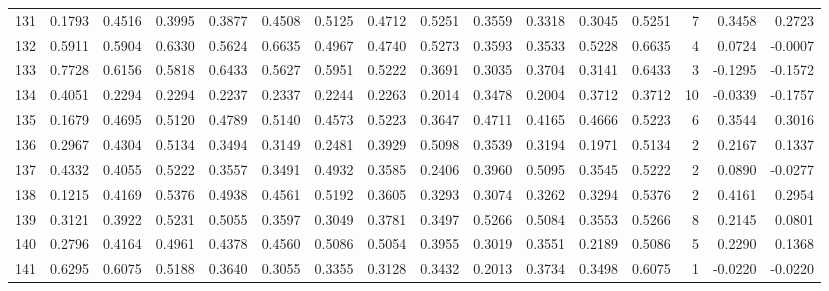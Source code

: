 \begin{tabular}{lrrrrrrrrrrrrrrr}
131 &      0.1793 &  0.4516 &  0.3995 &  0.3877 &  0.4508 &  0.5125 &  0.4712 &  0.5251 &  0.3559 &  0.3318 &   0.3045 &     0.5251 &      7 &                    0.3458 &                     0.2723 \\
132 &      0.5911 &  0.5904 &  0.6330 &  0.5624 &  0.6635 &  0.4967 &  0.4740 &  0.5273 &  0.3593 &  0.3533 &   0.5228 &     0.6635 &      4 &                    0.0724 &                    -0.0007 \\
133 &      0.7728 &  0.6156 &  0.5818 &  0.6433 &  0.5627 &  0.5951 &  0.5222 &  0.3691 &  0.3035 &  0.3704 &   0.3141 &     0.6433 &      3 &                   -0.1295 &                    -0.1572 \\
134 &      0.4051 &  0.2294 &  0.2294 &  0.2237 &  0.2337 &  0.2244 &  0.2263 &  0.2014 &  0.3478 &  0.2004 &   0.3712 &     0.3712 &     10 &                   -0.0339 &                    -0.1757 \\
135 &      0.1679 &  0.4695 &  0.5120 &  0.4789 &  0.5140 &  0.4573 &  0.5223 &  0.3647 &  0.4711 &  0.4165 &   0.4666 &     0.5223 &      6 &                    0.3544 &                     0.3016 \\
136 &      0.2967 &  0.4304 &  0.5134 &  0.3494 &  0.3149 &  0.2481 &  0.3929 &  0.5098 &  0.3539 &  0.3194 &   0.1971 &     0.5134 &      2 &                    0.2167 &                     0.1337 \\
137 &      0.4332 &  0.4055 &  0.5222 &  0.3557 &  0.3491 &  0.4932 &  0.3585 &  0.2406 &  0.3960 &  0.5095 &   0.3545 &     0.5222 &      2 &                    0.0890 &                    -0.0277 \\
138 &      0.1215 &  0.4169 &  0.5376 &  0.4938 &  0.4561 &  0.5192 &  0.3605 &  0.3293 &  0.3074 &  0.3262 &   0.3294 &     0.5376 &      2 &                    0.4161 &                     0.2954 \\
139 &      0.3121 &  0.3922 &  0.5231 &  0.5055 &  0.3597 &  0.3049 &  0.3781 &  0.3497 &  0.5266 &  0.5084 &   0.3553 &     0.5266 &      8 &                    0.2145 &                     0.0801 \\
140 &      0.2796 &  0.4164 &  0.4961 &  0.4378 &  0.4560 &  0.5086 &  0.5054 &  0.3955 &  0.3019 &  0.3551 &   0.2189 &     0.5086 &      5 &                    0.2290 &                     0.1368 \\
141 &      0.6295 &  0.6075 &  0.5188 &  0.3640 &  0.3055 &  0.3355 &  0.3128 &  0.3432 &  0.2013 &  0.3734 &   0.3498 &     0.6075 &      1 &                   -0.0220 &                    -0.0220 \\

\end{tabular}
